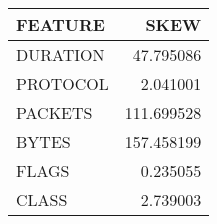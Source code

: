 \begin{tabular}{lr}
\toprule
 FEATURE &       SKEW \\
\midrule
DURATION &  47.795086 \\
PROTOCOL &   2.041001 \\
 PACKETS & 111.699528 \\
   BYTES & 157.458199 \\
   FLAGS &   0.235055 \\
   CLASS &   2.739003 \\
\bottomrule
\end{tabular}
